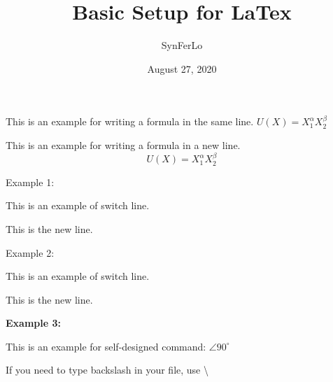 \documentclass{article}
\title{Basic Setup for LaTex}
\author{SynFerLo}
\date{August 27, 2020}
\newcommand \degree{^\circ}
\begin{document}
    \maketitle

    \newpage

    
    This is an example for writing a formula in the same line.
    $U(X)=X_{1}^\alpha X_{2}^\beta$

    This is an example for writing a formula in a new line.
    $$U(X)=X_{1}^\alpha X_{2}^\beta$$


    Example 1:

    This is an example of switch line.

    This is the new line.\newline

    Example 2:

    This is an example of switch line.

    This is the new line.\newline

    \textbf{Example 3:}

    This is an example for self-designed command:
    $\angle90\degree$


    If you need to type backslash in your file, use \textbackslash
\end{document}
